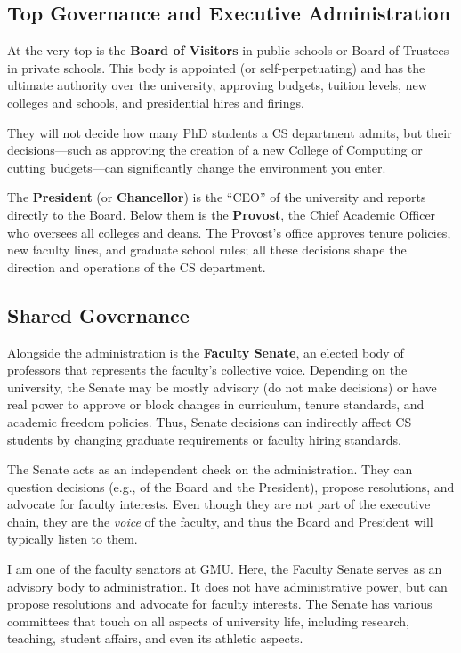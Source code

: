 \documentclass[oneside,11pt]{book}
\newenvironment{commentbox}[1][]{
  \small
  \begin{marker}[\faChessPawn{}]
    {\textbf{#1}}
  }{
  \end{marker}
}
\begin{document}
\subsection{Top Governance and Executive Administration}
At the very top is the \textbf{Board of Visitors} in public schools or Board of Trustees in private schools. This body is appointed (or self-perpetuating) and has the ultimate authority over the university, approving budgets, tuition levels, new colleges and schools, and presidential hires and firings.

They will not decide how many PhD students a CS department admits, but their decisions---such as approving the creation of a new College of Computing or cutting budgets---can significantly change the environment you enter.

The \textbf{President} (or \textbf{Chancellor}) is the ``CEO'' of the university and reports directly to the Board. Below them is the \textbf{Provost}, the Chief Academic Officer who oversees all colleges and deans. The Provost's office approves tenure policies, new faculty lines, and graduate school rules; all these decisions shape the direction and operations of the CS department.

\subsection{Shared Governance}
Alongside the administration is the \textbf{Faculty Senate}, an elected body of professors that represents the faculty's collective voice. Depending on the university, the Senate may be mostly advisory (do not make decisions) or have real power to approve or block changes in curriculum, tenure standards, and academic freedom policies. 
Thus, Senate decisions can indirectly affect CS students by changing graduate requirements or faculty hiring standards.

The Senate acts as an independent check on the administration. They can question decisions (e.g., of the Board and the President), propose resolutions, and advocate for faculty interests. Even though they are not part of the executive chain, they are the \emph{voice} of the faculty, and thus the Board and President will typically listen to them.

\begin{commentbox}
I am one of the faculty senators at GMU. Here, the Faculty Senate serves as an advisory body to administration. It  does not have administrative power, but can propose resolutions and advocate for faculty interests. The Senate has various committees that touch on all aspects of university life, including research, teaching, student affairs, and even its athletic aspects. %
\end{commentbox}
\end{document}
